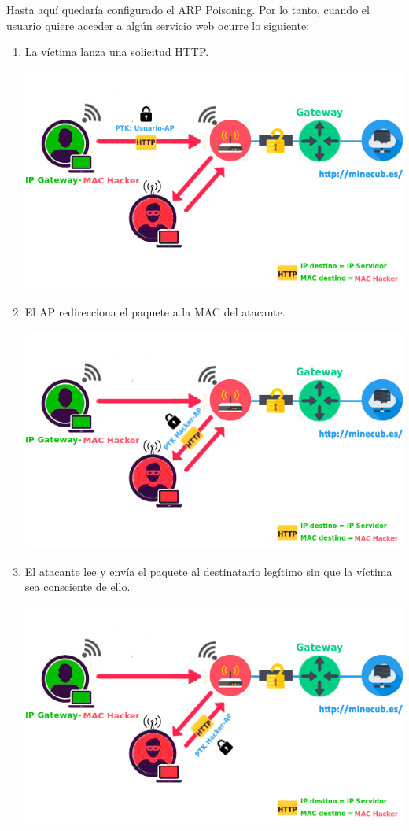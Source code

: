 Hasta aquí quedaría configurado el ARP Poisoning. Por lo tanto, cuando el usuario quiere acceder a algún servicio web ocurre lo siguiente:
\begin{enumerate}
	\item La víctima lanza una solicitud HTTP.
	\begin{center}
		\includegraphics[scale=0.7]{ARPpoison3.png}
	\end{center}
\newpage
	\item El AP redirecciona el paquete a la MAC del atacante.
	\begin{center}
		\includegraphics[scale=0.7]{ARPpoison3-2.png}
	\end{center}
	\item El atacante lee y envía el paquete al destinatario legítimo sin que la víctima sea consciente de ello.
	\begin{center}
		\includegraphics[scale=0.7]{ARPpoison3-3.png}
	\end{center}
\end{enumerate}
